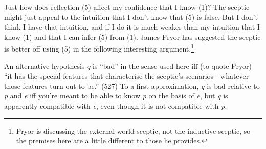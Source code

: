 
\noindent Just how does reflection (5) affect my confidence that I know (1)? The sceptic might just appeal to the intuition that I don't know that (5) is false. But I don't think I have that intuition, and if I do it is much weaker than my intuition that I know (1) and that I can infer (5) from (1). James Pryor \citeyearpar[527-529]{Pryor2000} has suggested the sceptic is better off using (5) in the following interesting argument.\footnote{Pryor is discussing the external world sceptic, not the inductive sceptic, so the premises here are a little different to those he provides.}

\bigskip 



\noindent An alternative hypothesis \textit{q} is ``bad'' in the sense used here iff (to quote Pryor) ``it has the special features that characterise the sceptic's scenarios---whatever those features turn out to be.'' (527) To a first approximation, \textit{q} is bad relative to \textit{p} and \textit{e} iff you're meant to be able to know \textit{p} on the basis of \textit{e}, but \textit{q }is apparently compatible with \textit{e}, even though it is not compatible with \textit{p}. 

